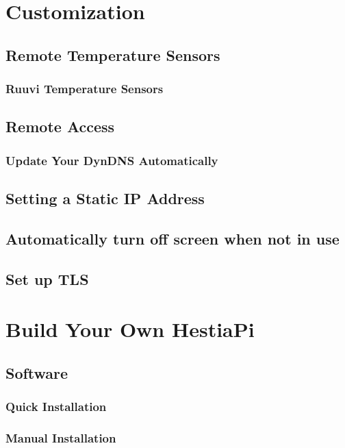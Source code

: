 \documentclass{article}
\begin{document}
\section{Customization}
\subsection{Remote Temperature Sensors} \label{Remote Temperature Sensors}

\subsubsection{Ruuvi Temperature Sensors} \label{Ruuvi Temperature Sensors}

\subsection{Remote Access}

\subsubsection{Update Your DynDNS Automatically}

\subsection{Setting a Static IP Address} \label{Static IP}

\subsection{Automatically turn off screen when not in use} \label{Automatically turn off screen when not in use}

\subsection{Set up TLS} \label{Set up TLS}


\section{Build Your Own HestiaPi}
\subsection{Software}
\subsubsection{Quick Installation} \label{Quick Installation}

\subsubsection{Manual Installation}

\end{document}
